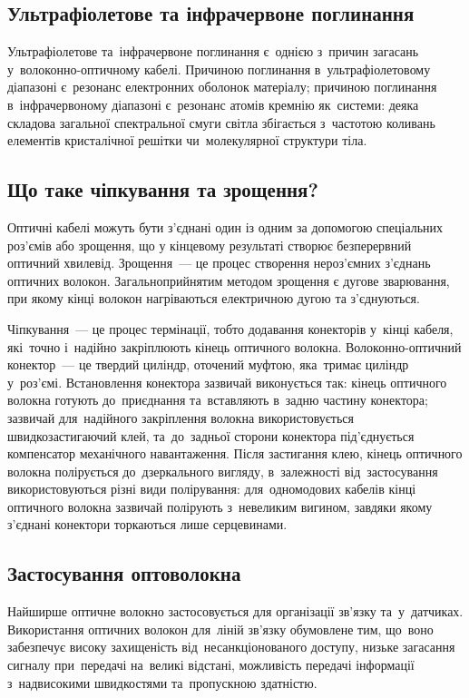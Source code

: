 \documentclass[
	a4paper,
	oneside,
	BCOR = 10mm,
	DIV = 12,
	12pt,
	headings = normal,
]{scrartcl}
\begin{document}
		\subsection{Ультрафіолетове та інфрачервоне поглинання}
			Ультрафіолетове та~інфрачервоне поглинання є~однією з~причин загасань у~волоконно-оптичному кабелі. Причиною поглинання в~ультрафіолетовому діапазоні є~резонанс електронних оболонок матеріалу; причиною поглинання в~інфрачервоному діапазоні є~резонанс атомів кремнію як~системи: деяка складова загальної спектральної смуги світла збігається з~частотою коливань елементів кристалічної решітки чи~молекулярної структури тіла.

		\subsection{Що таке чіпкування та зрощення?}
			Оптичні кабелі можуть бути з'єднані один із одним за допомогою спеціальних роз'ємів або зрощення, що у кінцевому результаті створює безперервний оптичний хвилевід. Зрощення~— це процес створення нероз'ємних з'єднань оптичних волокон. Загальноприйнятим методом зрощення є дугове зварювання, при якому кінці волокон нагріваються електричною дугою та з'єднуються.

			Чіпкування~— це процес термінації, тобто додавання конекторів у~кінці кабеля, які~точно і~надійно закріплюють кінець оптичного волокна. Волоконно-оптичний конектор~— це твердий циліндр, оточений муфтою, яка~тримає циліндр у~роз'ємі. Встановлення конектора зазвичай виконується так: кінець оптичного волокна готують до~приєднання та~вставляють в~задню частину конектора; зазвичай для~надійного закріплення волокна використовується швидкозастигаючий клей, та~до~задньої сторони конектора під'єднується компенсатор механічного навантаження. Після застигання клею, кінець оптичного волокна полірується до~дзеркального вигляду, в~залежності від~застосування використовуються різні види полірування: для~одномодових кабелів кінці оптичного волокна зазвичай полірують з~невеликим вигином, завдяки якому з'єднані конектори торкаються лише серцевинами.

		\subsection{Застосування оптоволокна}
			Найширше оптичне волокно застосовується для організації зв'язку та~у~датчиках. Використання оптичних волокон для~ліній зв'язку обумовлене тим, що~воно забезпечує високу захищеність від~несанкціонованого доступу, низьке загасання сигналу при~передачі на~великі відстані, можливість передачі інформації з~надвисокими швидкостями та~пропускною здатністю.
\end{document}
